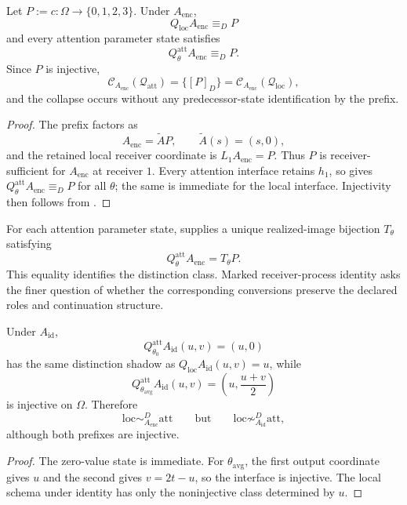 \begin{theorem}\label{thm:injective-attention-collapse-v14}
Let $P:=c:\Omega\to\{0,1,2,3\}$. Under $A_{\mathrm{enc}}$,
\[
Q_{\mathrm{loc}}A_{\mathrm{enc}}\equiv_DP
\]
and every attention parameter state satisfies
\[
Q^{\mathrm{att}}_{\theta}A_{\mathrm{enc}}\equiv_DP.
\]
Since $P$ is injective,
\[
\boxed{
\mathcal C_{A_{\mathrm{enc}}}(\mathcal Q_{\mathrm{att}})
=
\{[P]_D\}
=
\mathcal C_{A_{\mathrm{enc}}}(\mathcal Q_{\mathrm{loc}}),
}
\]
and the collapse occurs without any predecessor-state identification by the prefix.
\end{theorem}

\begin{proof}
The prefix factors as
\[
A_{\mathrm{enc}}=\widetilde A P,
\qquad
\widetilde A(s)=(s,0),
\]
and the retained local receiver coordinate is $L_1A_{\mathrm{enc}}=P$. Thus $P$ is receiver-sufficient for $A_{\mathrm{enc}}$ at receiver $1$. Every attention interface retains $h_1$, so  gives $Q^{\mathrm{att}}_\theta A_{\mathrm{enc}}\equiv_DP$ for all $\theta$; the same is immediate for the local interface. Injectivity then follows from .
\end{proof}

For each attention parameter state,  supplies a unique realized-image bijection $T_\theta$ satisfying
\[
Q^{\mathrm{att}}_\theta A_{\mathrm{enc}}=T_\theta P.
\]
This equality identifies the distinction class. Marked receiver-process identity asks the finer question of whether the corresponding conversions preserve the declared roles and continuation structure.

\begin{proposition}\label{prop:identity-attention-recovery-v13}
Under $A_{\mathrm{id}}$,
\[
Q_{\theta_0}^{\mathrm{att}}A_{\mathrm{id}}(u,v)=(u,0)
\]
has the same distinction shadow as $Q_{\mathrm{loc}}A_{\mathrm{id}}(u,v)=u$, while
\[
Q_{\theta_{\mathrm{avg}}}^{\mathrm{att}}A_{\mathrm{id}}(u,v)
=\left(u,\frac{u+v}{2}\right)
\]
is injective on $\Omega$. Therefore
\[
\boxed{
\mathrm{loc}\sim_{A_{\mathrm{enc}}}^D\mathrm{att}
\qquad\text{but}\qquad
\mathrm{loc}\not\sim_{A_{\mathrm{id}}}^D\mathrm{att},
}
\]
although both prefixes are injective.
\end{proposition}

\begin{proof}
The zero-value state is immediate. For $\theta_{\mathrm{avg}}$, the first output coordinate gives $u$ and the second gives $v=2t-u$, so the interface is injective. The local schema under identity has only the noninjective class determined by $u$.
\end{proof}

